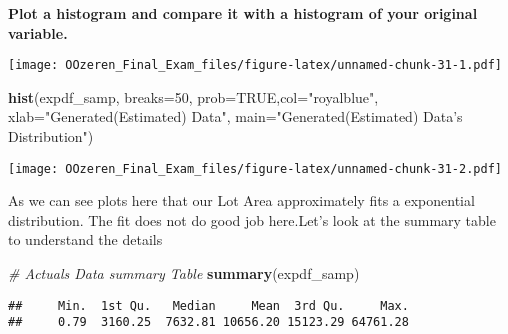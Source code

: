\documentclass[]{article}
\newenvironment{Shaded}{\begin{snugshade}}{\end{snugshade}}
\newcommand{\KeywordTok}[1]{\textcolor[rgb]{0.13,0.29,0.53}{\textbf{#1}}}
\newcommand{\DataTypeTok}[1]{\textcolor[rgb]{0.13,0.29,0.53}{#1}}
\newcommand{\DecValTok}[1]{\textcolor[rgb]{0.00,0.00,0.81}{#1}}
\newcommand{\StringTok}[1]{\textcolor[rgb]{0.31,0.60,0.02}{#1}}
\newcommand{\CommentTok}[1]{\textcolor[rgb]{0.56,0.35,0.01}{\textit{#1}}}
\newcommand{\OtherTok}[1]{\textcolor[rgb]{0.56,0.35,0.01}{#1}}
\newcommand{\OperatorTok}[1]{\textcolor[rgb]{0.81,0.36,0.00}{\textbf{#1}}}
\newcommand{\NormalTok}[1]{#1}
\begin{document}
\textbf{Plot a histogram and compare it with a histogram of your
original variable.}

\begin{Shaded}
\end{Shaded}

\texttt{[image: OOzeren\_Final\_Exam\_files/figure-latex/unnamed-chunk-31-1.pdf]}

\begin{Shaded}
\begin{Highlighting}[]
\KeywordTok{hist}\NormalTok{(expdf_samp, }\DataTypeTok{breaks=}\DecValTok{50}\NormalTok{, }\DataTypeTok{prob=}\OtherTok{TRUE}\NormalTok{,}\DataTypeTok{col=}\StringTok{"royalblue"}\NormalTok{, }\DataTypeTok{xlab=}\StringTok{"Generated(Estimated) Data"}\NormalTok{,}
     \DataTypeTok{main=}\StringTok{"Generated(Estimated) Data's Distribution"}\NormalTok{)}
\end{Highlighting}
\end{Shaded}

\texttt{[image: OOzeren\_Final\_Exam\_files/figure-latex/unnamed-chunk-31-2.pdf]}

As we can see plots here that our Lot Area approximately fits a
exponential distribution. The fit does not do good job here.Let's look
at the summary table to understand the details

\begin{Shaded}
\begin{Highlighting}[]
\CommentTok{# Actuals Data summary Table}
\KeywordTok{summary}\NormalTok{(expdf_samp)}
\end{Highlighting}
\end{Shaded}

\begin{verbatim}
##     Min.  1st Qu.   Median     Mean  3rd Qu.     Max. 
##     0.79  3160.25  7632.81 10656.20 15123.29 64761.28
\end{verbatim}

\begin{Shaded}
\end{Shaded}
\end{document}
